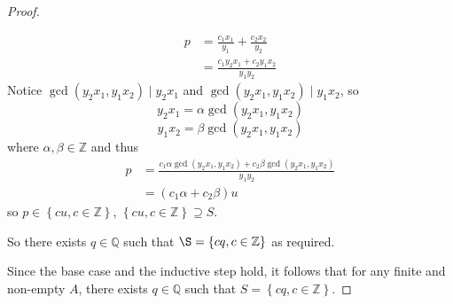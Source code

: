 \documentclass[letterpaper,12pt]{article}
\newcommand{\set}[1]{\left\{ #1 \right\}}
\theoremstyle{definition}
\begin{document}
\begin{enumerate}
\begin{mdframed}
\begin{proof}
\begin{itemize}
\begin{itemize}
\begin{align*}
                p &= \frac{c_1x_1}{y_1} + \frac{c_2 x_2}{y_2} \\
                &= \frac{c_1y_2x_1 + c_2 y_1x_2}{y_1y_2}
            \end{align*}
            Notice $\gcd (y_2x_1,y_1x_2) \mid y_2x_1$ and $\gcd (y_2x_1,y_1x_2) \mid y_1x_2$, so $$y_2x_1 = \alpha \gcd (y_2x_1,y_1x_2)$$ $$y_1x_2 = \beta \gcd (y_2x_1,y_1x_2)$$ where $\alpha,\beta \in \mathbb{Z}$ and thus
            \begin{align*}
                p &= \frac{c_1\alpha \gcd (y_2x_1,y_1x_2)  + c_2 \beta \gcd (y_2x_1,y_1x_2)}{y_1y_2} \\
                &= (c_1\alpha + c_2 \beta) u
            \end{align*}
            so $p \in \set{ cu, c \in \mathbb{Z} }$, $\set{ cu, c \in \mathbb{Z} } \supseteq S$.
        \end{itemize}
        So there exists $q \in \mathbb{Q}$ such that $\S = \set{cq, c \in \mathbb{Z}}$ as required.
    \end{itemize}
    Since the base case and the inductive step hold, it follows that for any finite and non-empty $A$, there exists $q \in \mathbb{Q}$ such that $S = \set{cq, c \in \mathbb{Z}}$.
      \end{proof}
  \end{mdframed}
\end{enumerate}
\pagebreak
\end{document}
